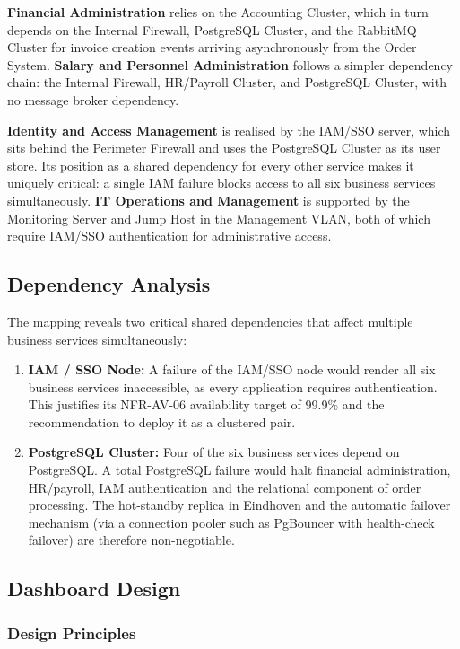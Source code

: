 \textbf{Financial Administration} relies on the Accounting Cluster, which in turn depends on the Internal Firewall, PostgreSQL Cluster, and the RabbitMQ Cluster for invoice creation events arriving asynchronously from the Order System. \textbf{Salary and Personnel Administration} follows a simpler dependency chain: the Internal Firewall, HR/Payroll Cluster, and PostgreSQL Cluster, with no message broker dependency.

\textbf{Identity and Access Management} is realised by the IAM/SSO server, which sits behind the Perimeter Firewall and uses the PostgreSQL Cluster as its user store. Its position as a shared dependency for every other service makes it uniquely critical: a single IAM failure blocks access to all six business services simultaneously. \textbf{IT Operations and Management} is supported by the Monitoring Server and Jump Host in the Management VLAN, both of which require IAM/SSO authentication for administrative access.

\subsection{Dependency Analysis}

The mapping reveals two critical shared dependencies that affect multiple business services simultaneously:

\begin{enumerate}
    \item \textbf{IAM / SSO Node:} A failure of the IAM/SSO node would render all six business services inaccessible, as every application requires authentication. This justifies its NFR-AV-06 availability target of 99.9\% and the recommendation to deploy it as a clustered pair.
    \item \textbf{PostgreSQL Cluster:} Four of the six business services depend on PostgreSQL. A total PostgreSQL failure would halt financial administration, HR/payroll, IAM authentication and the relational component of order processing. The hot-standby replica in Eindhoven and the automatic failover mechanism (via a connection pooler such as PgBouncer with health-check failover) are therefore non-negotiable.
\end{enumerate}

\subsection{Dashboard Design}

\subsubsection{Design Principles}

